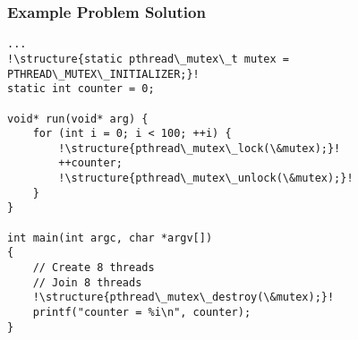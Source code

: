 \documentclass[aspectratio=43]{beamer}
\newenvironment{changemargin}[1]{%
  \begin{list}{}{%
    \setlength{\topsep}{0pt}%
    \setlength{\leftmargin}{#1}%
    \setlength{\rightmargin}{1em}
    \setlength{\listparindent}{\parindent}%
    \setlength{\itemindent}{\parindent}%
    \setlength{\parsep}{\parskip}%
  }%
  \item[]}{\end{list}}
\begin{document}
\begin{frame}[fragile]
  \frametitle{Example Problem Solution}
\begin{changemargin}{1.5cm}
  \begin{lstlisting}[escapechar=!]
...
!\structure{static pthread\_mutex\_t mutex = PTHREAD\_MUTEX\_INITIALIZER;}!
static int counter = 0;

void* run(void* arg) {
    for (int i = 0; i < 100; ++i) {
        !\structure{pthread\_mutex\_lock(\&mutex);}!
        ++counter;
        !\structure{pthread\_mutex\_unlock(\&mutex);}!
    }
}

int main(int argc, char *argv[])
{
    // Create 8 threads
    // Join 8 threads
    !\structure{pthread\_mutex\_destroy(\&mutex);}!
    printf("counter = %i\n", counter);
}
  \end{lstlisting}
\end{changemargin}

\end{frame}
\end{document}
